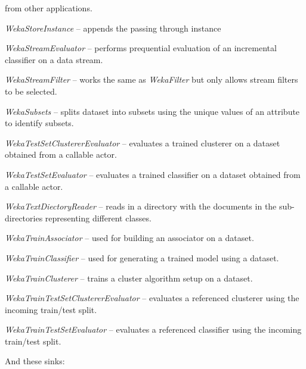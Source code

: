 \begin{tight_itemize}
	from other applications.
	\item \textit{WekaStoreInstance} -- appends the passing through instance
	\item \textit{WekaStreamEvaluator} -- performs prequential evaluation
	of an incremental classifier on a data stream.
	\item \textit{WekaStreamFilter} -- works the same as
	\textit{WekaFilter} but only allows stream filters to be selected.
	\item \textit{WekaSubsets} -- splits dataset into subsets using the unique
	values of an attribute to identify subsets.
	\item \textit{WekaTestSetClustererEvaluator} -- evaluates a trained
	clusterer on a dataset obtained from a callable actor.
	\item \textit{WekaTestSetEvaluator} -- evaluates a trained classifier on
	a dataset obtained from a callable actor.
	\item \textit{WekaTextDiectoryReader} -- reads in a directory with the 
	documents in the sub-directories representing different classes.
	\item \textit{WekaTrainAssociator} -- used for building an associator
	on a dataset.
	\item \textit{WekaTrainClassifier} -- used for generating a trained
	model using a dataset.
	\item \textit{WekaTrainClusterer} -- trains a cluster algorithm setup
	on a dataset.
	\item \textit{WekaTrainTestSetClustererEvaluator} -- evaluates a referenced
	clusterer using the incoming train/test split.
	\item \textit{WekaTrainTestSetEvaluator} -- evaluates a referenced classifier
	using the incoming train/test split.
\end{tight_itemize}
And these sinks:

